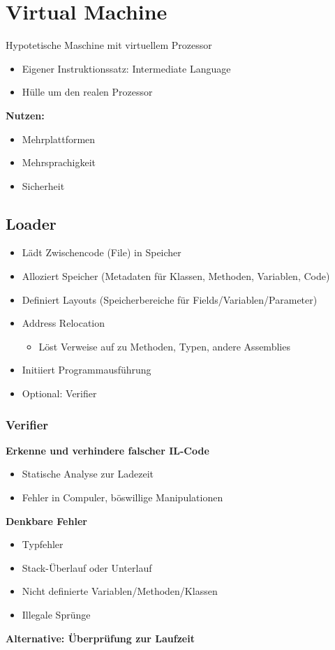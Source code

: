 \section{Virtual Machine}
Hypotetische Maschine mit virtuellem Prozessor
\begin{itemize}
    \item Eigener Instruktionssatz: Intermediate Language
    \item Hülle um den realen Prozessor
\end{itemize}
\textbf{Nutzen:}
\begin{itemize}
    \item Mehrplattformen
    \item Mehrsprachigkeit
    \item Sicherheit
\end{itemize}

\subsection{Loader}
\begin{itemize}
    \item Lädt Zwischencode (File) in Speicher
    \item Alloziert Speicher (Metadaten für Klassen, Methoden, Variablen, Code)
    \item Definiert Layouts (Speicherbereiche für Fields/Variablen/Parameter)
    \item Address Relocation
    \begin{itemize}
        \item Löst Verweise auf zu Methoden, Typen, andere Assemblies
    \end{itemize}
    \item Initiiert Programmausführung
    \item Optional: Verifier
\end{itemize}

\subsubsection{Verifier}
\textbf{Erkenne und verhindere falscher IL-Code}
\begin{itemize}
    \item Statische Analyse zur Ladezeit
    \item Fehler in Compuler, böswillige Manipulationen
\end{itemize}
\textbf{Denkbare Fehler}
\begin{itemize}
    \item Typfehler
    \item Stack-Überlauf oder Unterlauf
    \item Nicht definierte Variablen/Methoden/Klassen
    \item Illegale Sprünge
\end{itemize}
\textbf{Alternative: Überprüfung zur Laufzeit}

